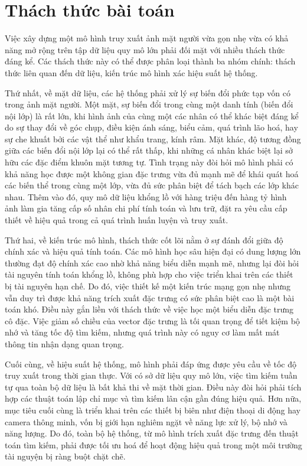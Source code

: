 \section{Thách thức bài toán}
Việc xây dựng một mô hình truy xuất ảnh mặt người vừa gọn nhẹ vừa có khả năng mở rộng trên tập dữ liệu quy mô lớn phải đối mặt với nhiều thách thức đáng kể. Các thách thức này có thể được phân loại thành ba nhóm chính: thách thức liên quan đến dữ liệu, kiến trúc mô hình xác hiệu suất hệ thống. 

Thứ nhất, về mặt dữ liệu, các hệ thống phải xử lý sự biến đổi phức tạp vốn có trong ảnh mặt người. Một mặt, sự biến đổi trong cùng một danh tính (biến đổi nội lớp) là rất lớn, khi hình ảnh của cùng một các nhân có thể khác biệt đáng kể do sự thay đổi về góc chụp, điều kiện ánh sáng, biểu cảm, quá trình lão hoá, hay sự che khuất bởi các vật thể như khẩu trang, kính râm. Mặt khác, độ tương đồng giữa các biến đổi nội lớp lại có thể rất thấp, khi những cá nhân khác biệt lại sở hữu các đặc điểm khuôn mặt tương tự. Tình trạng này đòi hỏi mô hình phải có khả năng học được một không gian đặc trưng vừa đủ mạnh mẽ để khái quát hoá các biến thể trong cùng một lớp, vừa đủ sức phân biệt để tách bạch các lớp khác nhau. Thêm vào đó, quy mô dữ liệu khổng lồ với hàng triệu đến hàng tỷ hình ảnh làm gia tăng cấp số nhân chi phí tính toán và lưu trữ, đặt ra yêu cầu cấp thiết về hiệu quả trong cả quá trình huấn luyện và truy xuất.

Thứ hai, về kiến trúc mô hình, thách thức cốt lõi nằm ở sự đánh đổi giữa độ chính xác và hiệu quả tính toán. Các mô hình học sâu hiện đại có dung lượng lớn thường đạt độ chính xác cao nhờ khả năng biểu diễn mạnh mẽ, nhưng lại đòi hỏi tài nguyên tính toán khổng lồ, không phù hợp cho việc triển khai trên các thiết bị tài nguyên hạn chế. Do đó, việc thiết kế một kiến trúc mạng gọn nhẹ nhưng vẫn duy trì được khả năng trích xuất đặc trưng có sức phân biệt cao là một bài toán khó. Điều này gắn liền với thách thức về việc học một biểu diễn đặc trưng cô đặc. Việc giảm số chiều của vector đặc trưng là tối quan trọng để tiết kiệm bộ nhớ và tăng tốc độ tìm kiếm, nhưng quá trình này có nguy cơ làm mất mát thông tin nhận dạng quan trọng.

Cuối cùng, về hiệu suất hệ thống, mô hình phải đáp ứng được yêu cầu về tốc độ truy xuất trong thời gian thực. Với có sở dữ liệu quy mô lớn, việc tìm kiếm tuần tự qua toàn bộ dữ liệu là bất khả thi về mặt thời gian. Điều này đòi hỏi phải tích hợp các thuật toán lập chỉ mục và tìm kiếm lân cận gần đúng hiệu quả. Hơn nữa, mục tiêu cuối cùng là triển khai trên các thiết bị biên như điện thoại di động hay camera thông minh, vốn bị giới hạn nghiêm ngặt về năng lực xử lý, bộ nhớ và năng lượng. Do đó, toàn bộ hệ thống, từ mô hình trích xuất đặc trưng đến thuật toán tìm kiếm, phải được tối ưu hoá để hoạt động hiệu quả trong một môi trường tài nguyện bị ràng buột chặt chẽ.

